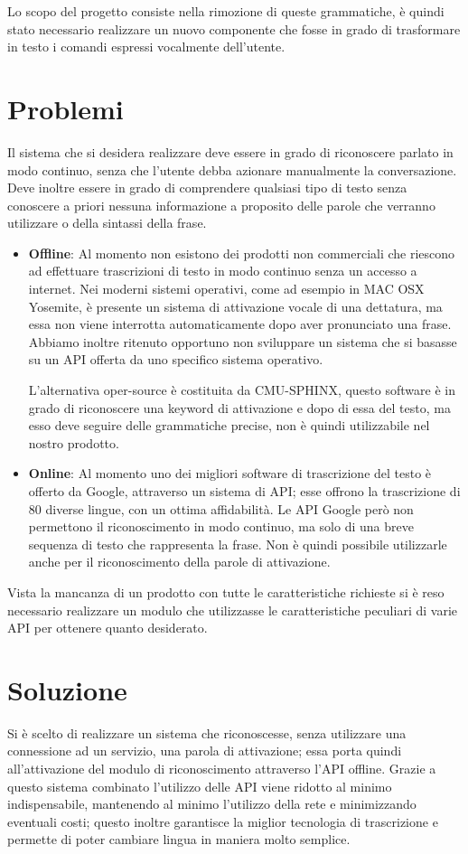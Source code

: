 \documentclass[twoside]{supsistudent}
\begin{document}
Lo scopo del progetto consiste nella rimozione di queste grammatiche, è quindi stato necessario realizzare un nuovo componente che fosse in grado di trasformare in testo i comandi espressi vocalmente dell'utente.
\section{Problemi}
Il sistema che si desidera realizzare deve essere in grado di riconoscere parlato in modo continuo, senza che l'utente debba azionare manualmente la conversazione. 
Deve inoltre essere in grado di comprendere qualsiasi tipo di testo senza conoscere a priori nessuna informazione a proposito delle parole che verranno utilizzare o della sintassi della frase. 


\begin{itemize}
	\item \textbf{Offline}: Al momento non esistono dei prodotti non commerciali che riescono ad effettuare trascrizioni di testo in modo continuo senza un accesso a internet. Nei moderni sistemi operativi, come ad esempio in MAC OSX Yosemite, è presente un sistema di 		attivazione vocale di una dettatura, ma essa non viene interrotta automaticamente dopo aver pronunciato una frase. Abbiamo inoltre ritenuto opportuno non sviluppare un sistema che si basasse su un API offerta da uno specifico sistema operativo. 
	
	L'alternativa oper-source è costituita da CMU-SPHINX, questo software è in grado di riconoscere una keyword di attivazione e dopo di essa del testo, ma esso deve seguire delle grammatiche precise, non è quindi utilizzabile nel nostro prodotto.
	\item \textbf{Online}: Al momento uno dei migliori software di trascrizione del testo è offerto da Google, attraverso un sistema di API; esse offrono la trascrizione di 80 diverse lingue, con un ottima affidabilità.
		Le API Google però non permettono il riconoscimento in modo continuo, ma solo di una breve sequenza di testo che rappresenta la frase.
		Non è quindi possibile utilizzarle anche per il riconoscimento della parole di attivazione.
\end{itemize}

Vista la mancanza di un prodotto con tutte le caratteristiche richieste si è reso necessario realizzare un modulo che utilizzasse le caratteristiche peculiari di varie API per ottenere quanto desiderato.


\section{Soluzione}
Si è scelto di realizzare un sistema che riconoscesse, senza utilizzare una connessione ad un servizio, una parola di attivazione; essa porta quindi all'attivazione del modulo di riconoscimento attraverso l'API offline.
Grazie a questo sistema combinato l'utilizzo delle API viene ridotto al minimo indispensabile, mantenendo al minimo l'utilizzo della rete e minimizzando eventuali costi; questo inoltre garantisce la miglior tecnologia di trascrizione e permette di poter cambiare lingua in maniera molto semplice.
\end{document}
